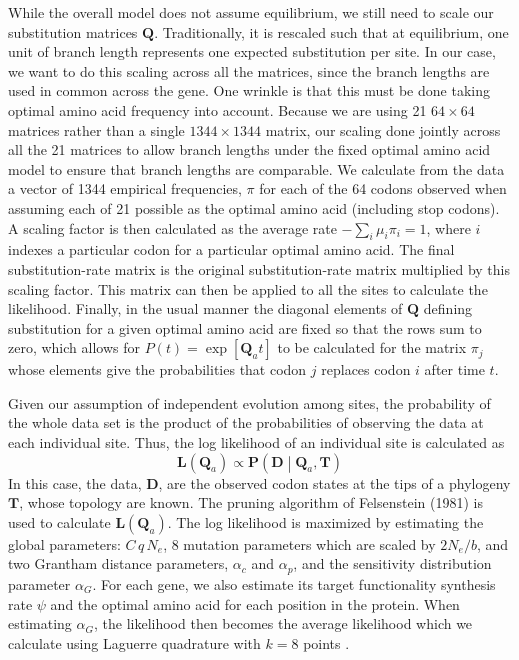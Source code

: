 \documentclass{article}
\newcommand{\Ne}{\ensuremath{{N_e}}\xspace} %
\newcommand{\Pij}{\ensuremath{\pi_{j}}\xspace}
\newcommand{\Pmatrix}{\mathbf{P}\xspace}
\newcommand{\Tmatrix}{\mathbf{T}\xspace}
\newcommand{\Dmatrix}{\mathbf{D}\xspace}
\newcommand{\Lmatrix}{\mathbf{L}\xspace}
\newcommand{\Qmatrix}{\mathbf{Q}\xspace}
\newcommand{\Qmatrixa}{\ensuremath{\Qmatrix_a}\xspace}
\newcommand{\alphac}{\ensuremath{\alpha_c}\xspace}
\newcommand{\alphag}{\ensuremath{\alpha_G}\xspace}
\newcommand{\alphap}{\ensuremath{\alpha_p}\xspace}
\begin{document}
While the overall model does not assume equilibrium, we still need to scale our substitution matrices $\Qmatrix$.
Traditionally, it is rescaled such that at equilibrium, one unit of branch length represents one expected substitution per site.
In our case, we want to do this scaling across all the matrices, since the branch lengths are used in common across the gene.
One wrinkle is that this must be done taking optimal amino acid frequency into account.
Because we are using 21 $64 \times 64$ matrices rather than a single $1344 \times 1344$ matrix, our scaling done jointly across all the 21 matrices to allow branch lengths under the fixed optimal amino acid model to ensure that branch lengths are comparable.
We calculate from the data a vector of 1344 empirical frequencies, $\pi$ for each of the 64 codons observed when assuming each of 21 possible as the optimal amino acid (including stop codons).
A scaling factor is then calculated as the average rate $-\sum_i \mu_i \pi_i=1$, where $i$ indexes a particular codon for a particular optimal amino acid.
The final substitution-rate matrix is the original substitution-rate matrix multiplied by this scaling factor.
This matrix can then be applied to all the sites to calculate the likelihood.
Finally, in the usual manner the diagonal elements of $\Qmatrix$ defining substitution for a given optimal amino acid are fixed so that the rows sum to zero, which allows for $P(t) = \exp\left[\Qmatrixa t\right]$ to be calculated for the matrix $\Pij$ whose elements give the probabilities that codon $j$ replaces codon $i$ after time $t$.

Given our assumption of independent evolution among sites, the probability of the whole data set is the product of the probabilities of observing the data at each individual site.
Thus, the log likelihood of an individual site is calculated as
\begin{equation}
\Lmatrix\left(\Qmatrixa\right) \propto \Pmatrix\left(\Dmatrix\middle|\Qmatrixa,\Tmatrix\right)
\end{equation}
In this case, the data, $\Dmatrix$, are the observed codon states at the tips of a phylogeny $\Tmatrix$, whose topology are known.
The pruning algorithm of Felsenstein (1981) is used to calculate $\Lmatrix(\Qmatrixa)$.
The log likelihood is maximized by estimating the global parameters: $C \, q \, \Ne$, 8 mutation parameters which are scaled by $2 \Ne/b$, and two Grantham distance parameters, $\alphac$ and $\alphap$, and the sensitivity distribution parameter \alphag.
For each gene, we also estimate its target functionality synthesis rate $\psi$  and the optimal amino acid for each position in the protein.
When estimating \alphag, the likelihood then becomes the average likelihood which we calculate using Laguerre quadrature with $k = 8$ points  \citep{Yang1994,Felsenstein2001}.





\end{document}
